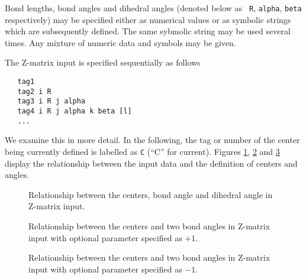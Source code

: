 Bond lengths, bond angles and dihedral angles (denoted below as {\tt
  R}, {\tt alpha}, {\tt beta} respectively) may be specified either as
numerical values or as symbolic strings which are subsequently
defined.  The same sybmolic string may be used several times.  Any
mixture of numeric data and symbols may be given. 

The Z-matrix input is specified sequentially as follows
\begin{verbatim}
   tag1
   tag2 i R
   tag3 i R j alpha
   tag4 i R j alpha k beta [l]
   ...
\end{verbatim}

We examine this in more detail.  In the following, the tag or number
of the center being currently defined is labelled as \verb+C+ (``C''
for current).  Figures \ref{fig:zmat1}, \ref{fig:zmat2} and
\ref{fig:zmat3} display the relationship between the input data 
and the definition of centers and angles.

\begin{figure}[htbp]
\centering
{}

\caption{\label{fig:zmat1} Relationship between the centers, bond angle
and dihedral angle in Z-matrix input.}
\end{figure}

\begin{figure}[htbp]
\centering
{}

\caption{\label{fig:zmat2} Relationship between the centers and two
  bond angles in Z-matrix input with optional parameter specified as $+1$.}
\end{figure}

\begin{figure}[htbp]
\centering
{}

\caption{\label{fig:zmat3} Relationship between the centers and two
  bond angles in Z-matrix input with optional parameter specified as $-1$.}
\end{figure}

